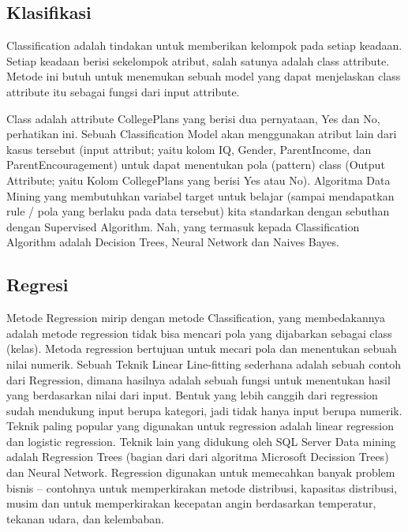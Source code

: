 \subsection{Klasifikasi}
\hfill\break
Classification adalah tindakan untuk memberikan kelompok pada setiap keadaan. Setiap keadaan berisi sekelompok atribut, salah satunya adalah class attribute. Metode ini butuh untuk menemukan sebuah model yang dapat menjelaskan class attribute itu sebagai fungsi dari input attribute.

\noindent
Class adalah attribute CollegePlans yang berisi dua pernyataan, Yes dan No, perhatikan ini.
\noindent
Sebuah Classification Model akan menggunakan atribut lain dari kasus tersebut (input attribut; yaitu kolom IQ, Gender, ParentIncome, dan ParentEncouragement) untuk dapat menentukan pola (pattern) class (Output Attribute; yaitu Kolom CollegePlans yang berisi Yes atau No).
\noindent
Algoritma Data Mining yang membutuhkan variabel target untuk belajar (sampai mendapatkan rule / pola yang berlaku pada data tersebut) kita standarkan dengan sebuthan dengan Supervised Algorithm.
\noindent
Nah, yang termasuk kepada Classification Algorithm adalah Decision Trees, Neural Network dan Naives Bayes.
\subsection{Regresi}
\hfill\break
Metode Regression mirip dengan metode Classification, yang membedakannya adalah metode regression tidak bisa mencari pola yang dijabarkan sebagai class (kelas).
\noindent
Metoda regression bertujuan untuk mecari pola dan menentukan sebuah nilai numerik.
\noindent
Sebuah Teknik Linear Line-fitting sederhana adalah sebuah contoh dari Regression, dimana hasilnya adalah sebuah fungsi untuk menentukan hasil yang berdasarkan nilai dari input.
\noindent
Bentuk yang lebih canggih dari regression sudah mendukung input berupa kategori, jadi tidak hanya input berupa numerik. Teknik paling popular yang digunakan untuk regression adalah linear regression dan logistic regression. Teknik lain yang didukung oleh SQL Server Data mining adalah Regression Trees (bagian dari dari algoritma Microsoft Decission Trees) dan Neural Network.
\noindent
Regression digunakan untuk memecahkan banyak problem bisnis – contohnya untuk memperkirakan metode distribusi, kapasitas distribusi, musim dan untuk memperkirakan kecepatan angin berdasarkan temperatur, tekanan udara, dan kelembaban.
